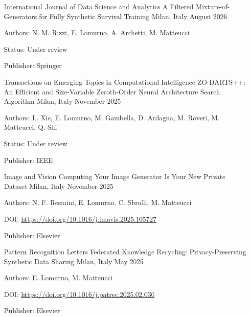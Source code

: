 
\begin{cventries}

    \cventry
        {International Journal of Data Science and Analytics}
        {A Filtered Mixture-of-Generators for Fully Synthetic Survival Training}
        {Milan, Italy}
        {August 2026}
        {
        \begin{cvitems}
            \item {Authors: N. M. Rizzi, E. Lomurno, A. Archetti, M. Matteucci}
            \item {Status: Under review}
            \item {Publisher: Springer}
        \end{cvitems}
        }

    \vspace{2mm}
    \cventry
        {Transactions on Emerging Topics in Computational Intelligence}
        {ZO-DARTS++: An Efficient and Size-Variable Zeroth-Order Neural Architecture Search Algorithm}
        {Milan, Italy}
        {November 2025}
        {
        \begin{cvitems}
            \item {Authors: L. Xie, E. Lomurno, M. Gambella, D. Ardagna, M. Roveri, M. Matteucci, Q. Shi}
            \item {Status: Under review}
            \item {Publisher: IEEE}
        \end{cvitems}
        }

    \vspace{2mm}
    \cventry
        {Image and Vision Computing}
        {Your Image Generator Is Your New Private Dataset}
        {Milan, Italy}
        {November 2025}
        {
        \begin{cvitems}
            \item {Authors: N. F. Resmini, E. Lomurno, C. Sbrolli, M. Matteucci}
            \item {DOI: \url{https://doi.org/10.1016/j.imavis.2025.105727}}
            \item {Publisher: Elsevier}
        \end{cvitems}
        }

    \vspace{2mm}
    \cventry
        {Pattern Recognition Letters}
        {Federated Knowledge Recycling: Privacy-Preserving Synthetic Data Sharing}
        {Milan, Italy}
        {May 2025}
        {
        \begin{cvitems}
            \item {Authors: E. Lomurno, M. Matteucci}
            \item {DOI: \url{https://doi.org/10.1016/j.patrec.2025.02.030}}
            \item {Publisher: Elsevier}
        \end{cvitems}
        }


\end{cventries}

